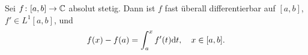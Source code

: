 Sei $f\colon[a,b]\to \mathbb{C}$ absolut stetig. Dann ist $f$ fast überall differentierbar auf $[a,b]$, $f'\in L^1[a,b]$, und
\begin{equation*}
    f(x) - f(a) = \int_a^x f'(t)\mathrm{d} t, \quad x\in[a,b].
\end{equation*}